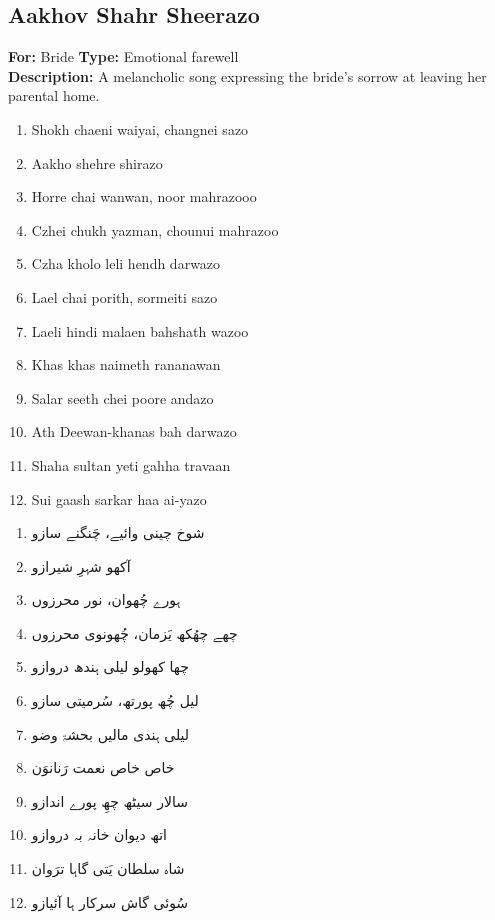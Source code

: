 \documentclass[12pt]{article}
\newcommand{\bigroman}[1]{\fontsize{16pt}{18pt}\selectfont\RaggedRight #1}
\newcommand{\bigarabic}[1]{\fontsize{16pt}{18pt}\selectfont \textarabic{#1}}
\begin{document}
\begin{multicols}{2}
\subsection*{Aakhov Shahr Sheerazo}
\textbf{For:} Bride \quad \textbf{Type:} Emotional farewell\\
\textbf{Description:} A melancholic song expressing the bride's sorrow at leaving her parental home.

\begin{multicols}{2}
\begin{enumerate}[leftmargin=*, label=\arabic*., font=\fontsize{16pt}{18pt}\selectfont]
  \item \bigroman{Shokh chaeni waiyai, changnei sazo}
  \item \bigroman{Aakho shehre shirazo}
  \item \bigroman{Horre chai wanwan, noor mahrazooo}
  \item \bigroman{Czhei chukh yazman, chounui mahrazoo}
  \item \bigroman{Czha kholo leli hendh darwazo}
  \item \bigroman{Lael chai porith, sormeiti sazo}
  \item \bigroman{Laeli hindi malaen bahshath wazoo}
  \item \bigroman{Khas khas naimeth rananawan}
  \item \bigroman{Salar seeth chei poore andazo}
  \item \bigroman{Ath Deewan-khanas bah darwazo}
  \item \bigroman{Shaha sultan yeti gahha travaan}
  \item \bigroman{Sui gaash sarkar haa ai-yazo}
\end{enumerate}

\columnbreak

\begin{RTL}
\begin{enumerate}[leftmargin=*, label=\arabic*., font=\fontsize{16pt}{18pt}\selectfont]
  \item \bigarabic{شوخ چینی وائیے، چَنگنے سازو}
  \item \bigarabic{آکھو شہرِ شیرازو}
  \item \bigarabic{ہورے چُھوان، نور محرزوں}
  \item \bigarabic{چھے چھُکھ یَزمان، چُھونوی محرزوں}
  \item \bigarabic{چھا کھولو لیلی ہندھ دروازو}
  \item \bigarabic{لیل چُھ پورتھ، سُرمیتی سازو}
  \item \bigarabic{لیلی ہندی مالیں بحشۃ وضو}
  \item \bigarabic{خاص خاص نعمت رَنانوَن}
  \item \bigarabic{سالار سیٹھ چھِ پورے اندازو}
  \item \bigarabic{اتھ دیوان خانہ بہ دروازو}
  \item \bigarabic{شاہ سلطان یَتی گاہا ترَوان}
  \item \bigarabic{سُوئی گاش سرکار ہا آئیازو}
\end{enumerate}
\end{RTL}
\end{multicols}


\end{multicols}
\end{document}
